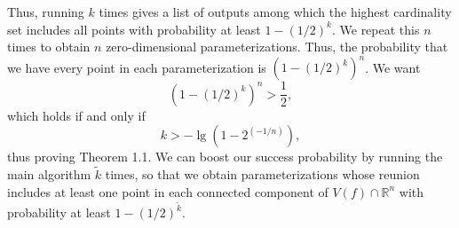 \documentclass[sigconf]{acmart}
\def\R{\mathbb{R}}
\def\kt{\widetilde{k}}
\begin{document}
Thus, running \cite[Algorithm 2]{SH} $k$ times gives a list of outputs among which the highest cardinality set includes all points with probability at least $1-(1/2)^k$. We repeat this $n$ times to obtain $n$ zero-dimensional parameterizations. Thus, the probability that we have every point in each parameterization is $(1-(1/2)^k)^n$. We want 
\[
(1-(1/2)^k)^n>\frac{1}{2},
\]
which holds if and only if 
\[
k > -\lg(1-2^{(-1/n)}),
\]
thus proving Theorem 1.1. We can boost our success probability by running the main algorithm $\kt$ times, so that we obtain parameterizations whose reunion includes at least one point in each connected component of $V(f) \cap \R^n$ with probability at least $1 - (1/2)^{\kt}$. 


\end{document}
